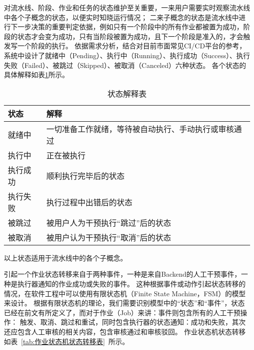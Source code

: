 对流水线、阶段、作业和任务的状态维护至关重要，一来用户需要实时观察流水线中各个子概念的状态，以便实时知晓运行情况；
二来子概念的状态是流水线中进行下一步决策的重要判定依据，例如只有一个阶段中的所有作业都被置为成功，阶段的状态才会变为成功，只有当阶段被置为成功，且下一个阶段是准入的，才会触发写一个阶段的执行。
依据需求分析，结合对目前市面常见CI/CD平台的参考，系统中设计了就绪中（Pending）、执行中（Running）、执行成功（Success）、执行失败（Failed）、被跳过（Skipped）、被取消（Canceled）六种状态。
各个状态的具体解释如表\ref{tab:状态解释表}所示。
\begin{table}[h]
  \centering
  \caption{状态解释表}
  \label{tab:状态解释表}
  \begin{tabular}{ll}
    \toprule
    状态           & 解释                                     \\
    \midrule
    就绪中         & 一切准备工作就绪，等待被自动执行、手动执行或审核通过\\
    执行中         & 正在被执行                 \\
    执行成功       & 顺利执行完毕后的状态        \\
    执行失败       & 执行过程中出错后的状态       \\
    被跳过         & 被用户人为干预执行“跳过”后的状态         \\
    被取消         & 被用户认为干预执行“取消”后的状态         \\
    \bottomrule
  \end{tabular}
\end{table}
以上状态适用于流水线中的各个子概念。

引起一个作业状态转移来自于两种事件，一种是来自Backend的人工干预事件，一种是执行器通知的作业成功或失败的事件。
这种根据事件或动作引起状态转移的情况，在软件工程中可以使用有限状态机（Finite State Machine，FSM）的模型来设计。
根据有限状态机的理论，我们需要识别模型中的“状态”和“事件”，状态已经在前文有所定义了，而对于作业（Job）来讲：事件则包含所有的人工干预操作：
触发、取消、跳过和重试，同时包含执行器的状态通知：成功和失败，其次还应包含人工审核的相关内容，包含审核通过和审核驳回。
作业状态机状态转移如表~\ref{tab:作业状态机状态转移表}~所示。

